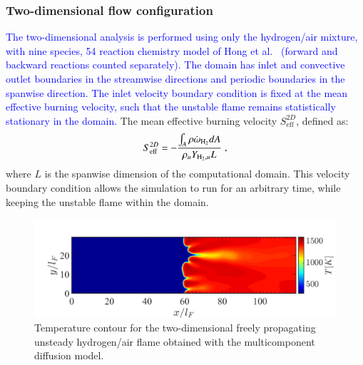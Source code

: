 \documentclass[preprint,review,12pt]{elsarticle}
\begin{document}
\subsubsection{Two-dimensional flow configuration}\label{sec:twoDconfig}
\textcolor{blue}{The two-dimensional analysis is performed using only the hydrogen/air mixture, with nine species, 54 reaction chemistry model of Hong et al.~\cite{Hong2011AnMeasurements,Lam2013AAbsorption,Hong2013OnAbsorption} (forward and backward reactions counted separately).  The domain has inlet and convective outlet boundaries in the streamwise directions and periodic boundaries in the spanwise direction.
The inlet velocity boundary condition is fixed at the mean effective burning velocity, such that the unstable flame remains statistically stationary in the domain.}  The mean effective burning velocity $S_{\text{eff}}^{2D}$, defined as:
\begin{equation}
S_{\text{eff}}^{2D}=-\frac{\int_{A} \rho \dot{\omega}_{\ce{H2}} dA}{\rho_{u} Y_{\ce{H2},u} L} \;,
\end{equation}
where $L$ is the spanwise dimension of the computational domain.
This velocity boundary condition allows the simulation to run for an arbitrary time, while keeping the unstable flame within the domain.
\begin{figure}[!tb]
\centering
\includegraphics[trim={1.75cm 0 0 2cm},clip,width=\columnwidth]{2D_flame_temp.pdf}
\caption{Temperature contour for the two-dimensional freely propagating unsteady hydrogen/air flame obtained with the multicomponent diffusion model.} \label{2D_temp}
\end{figure}
\end{document}
